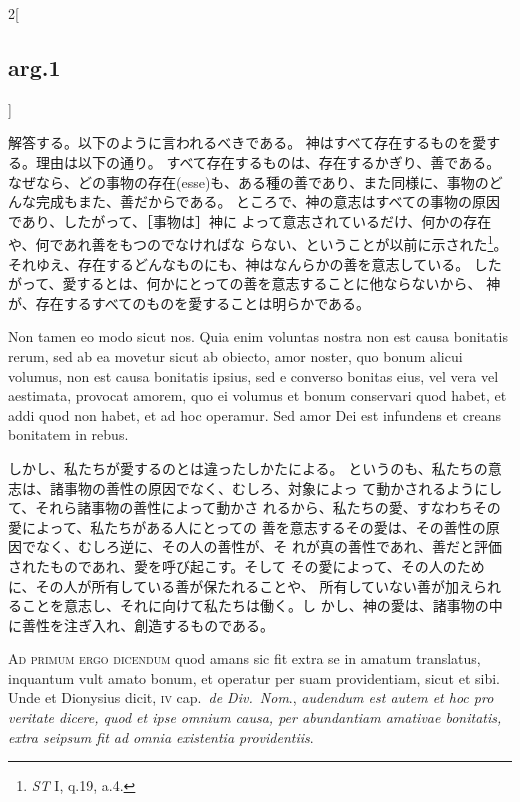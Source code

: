 \documentclass[paper=a4paper,fontsize=10pt,jafontsize=9pt,titlepage]{jlreq}
\begin{document}
\begin{paracol}{2}[\subsection{arg.1}]
\switchcolumn

解答する。以下のように言われるべきである。
神はすべて存在するものを愛する。理由は以下の通り。
すべて存在するものは、存在するかぎり、善である。
なぜなら、どの事物の存在(esse)も、ある種の善であり、また同様に、事物のど
 んな完成もまた、善だからである。
ところで、神の意志はすべての事物の原因であり、したがって、［事物は］神に
 よって意志されているだけ、何かの存在や、何であれ善をもつのでなければな
 らない、ということが以前に示された\footnote{{\itshape ST} I, q.19, a.4.}。
それゆえ、存在するどんなものにも、神はなんらかの善を意志している。
したがって、愛するとは、何かにとっての善を意志することに他ならないから、
 神が、存在するすべてのものを愛することは明らかである。

\switchcolumn*


Non tamen eo modo sicut
nos. Quia enim voluntas nostra non est causa bonitatis rerum, sed ab ea
movetur sicut ab obiecto, amor noster, quo bonum alicui volumus, non est
causa bonitatis ipsius, sed e converso bonitas eius, vel vera vel
aestimata, provocat amorem, quo ei volumus et bonum conservari quod
habet, et addi quod non habet, et ad hoc operamur. Sed amor Dei est
infundens et creans bonitatem in rebus.

\switchcolumn

しかし、私たちが愛するのとは違ったしかたによる。
というのも、私たちの意志は、諸事物の善性の原因でなく、むしろ、対象によっ
 て動かされるようにして、それら諸事物の善性によって動かさ
 れるから、私たちの愛、すなわちその愛によって、私たちがある人にとっての
 善を意志するその愛は、その善性の原因でなく、むしろ逆に、その人の善性が、そ
 れが真の善性であれ、善だと評価されたものであれ、愛を呼び起こす。そして
 その愛によって、その人のために、その人が所有している善が保たれることや、
 所有していない善が加えられることを意志し、それに向けて私たちは働く。し
 かし、神の愛は、諸事物の中に善性を注ぎ入れ、創造するものである。

\switchcolumn*[\subsection{ad.1}]


{\scshape Ad primum ergo dicendum} quod amans sic fit
extra se in amatum translatus, inquantum vult amato bonum, et operatur
per suam providentiam, sicut et sibi. Unde et Dionysius dicit, {\scshape iv}
cap.~{\itshape de Div.~Nom}., {\itshape audendum est autem et hoc pro veritate dicere, quod
et ipse omnium causa, per abundantiam amativae bonitatis, extra seipsum
fit ad omnia existentia providentiis}.


\end{paracol}
\end{document}
